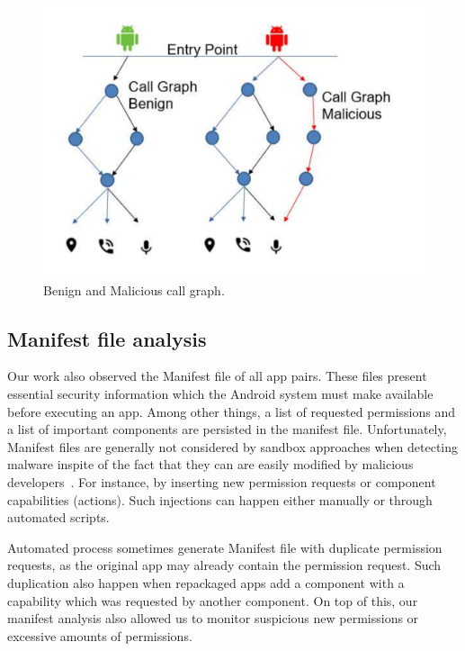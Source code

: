 \begin{figure}[ht]
\centering
\includegraphics[scale=0.25]{images/maliciousCallGraph.pdf}
\caption{Benign and Malicious call graph.}
 \label{fig:callGraph}
\end{figure}


\subsection{Manifest file analysis}\label{sec:manifestAnalysis}

Our work also observed the Manifest file of all app pairs. These files present essential security information which the Android system must make available before executing an app. Among other things, a  list of requested permissions and a list of important components are persisted in the manifest file. Unfortunately, Manifest files are generally not considered by sandbox approaches when detecting malware inspite of the fact that they can are easily modified by malicious developers~\cite{DBLP:journals/corr/abs-1208-4536}. For instance, by inserting new permission requests or component capabilities (actions). Such injections can happen either manually or through automated scripts.

Automated process sometimes generate Manifest file with duplicate permission requests, as the original app may already contain the permission request. Such duplication also happen when repackaged apps add a component with a capability which was requested by another component. On top of this, our manifest analysis also allowed us to monitor suspicious new permissions or excessive amounts of permissions. 

